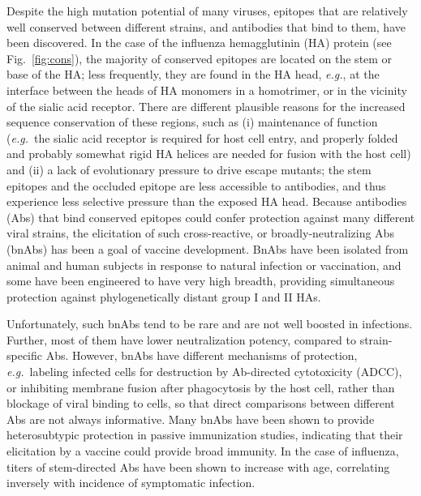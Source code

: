 \documentclass[utf8]{frontiersHLTH}%
\def\eg {{\it e.g.}}
\newcommand{\fig}[1]{Fig.~\ref{fig:#1}}
\begin{document}
Despite the high mutation potential of many viruses,
epitopes that are relatively well conserved between different strains, and
antibodies that bind to them, have been discovered. In the case of the
influenza hemagglutinin (HA) protein (see \fig{cons}), 
the majority of conserved epitopes are located
on the stem or base of the HA\cite{nachbagauer17,corti17};
less frequently, they are found in the HA head, \eg,
at the interface between the heads of HA monomers\cite{watanabe19,bajic19}
in a homotrimer, or in the vicinity of the sialic acid receptor\cite{raymond18,bajic19a}.
There are different plausible reasons for the increased sequence
conservation of these regions, such as (i) maintenance of function (\eg~the
sialic acid receptor is required for host cell entry, and properly
folded and probably somewhat rigid HA helices are needed for fusion with the
host cell) and (ii) a lack of evolutionary pressure to drive escape
mutants\cite{raymond18}; the stem epitopes and the occluded epitope\cite{watanabe19}
are less accessible to antibodies, and thus
experience less selective pressure than the exposed HA head.
Because antibodies (Abs) that bind conserved epitopes could confer protection
against many different viral strains, the elicitation of such cross-reactive, or
broadly-neutralizing Abs (bnAbs) has been a goal of vaccine development.\cite{nachbagauer17}
BnAbs have been isolated from animal and human subjects in response
to natural infection or vaccination,\cite{corti17} and some have been engineered\cite{kallewaard16}
to have very high breadth, providing simultaneous protection
against phylogenetically distant group I and II HAs.\cite{corti11,li12,kallewaard16}

Unfortunately, such bnAbs tend to be rare and are not well boosted in
infections\cite{li12,ellebedy14,tan19,arevalo20}.
Further, most of them have lower neutralization potency, compared to strain-specific Abs.
However, bnAbs have
different mechanisms of protection, \eg~labeling infected cells for
destruction by Ab-directed cytotoxicity (ADCC), or inhibiting membrane
fusion after phagocytosis by the host cell,\cite{nachbagauer17} rather than blockage of viral
binding to cells, so that direct comparisons between different Abs are not always
informative.
Many bnAbs have been shown to provide heterosubtypic protection in
passive immunization studies,\cite{corti17} indicating that their elicitation by
a vaccine could provide broad immunity. In the case of
influenza, titers of stem-directed Abs have been shown to increase with
age, correlating inversely with incidence of symptomatic
infection.\cite{Nachbagauer16}
\end{document}
